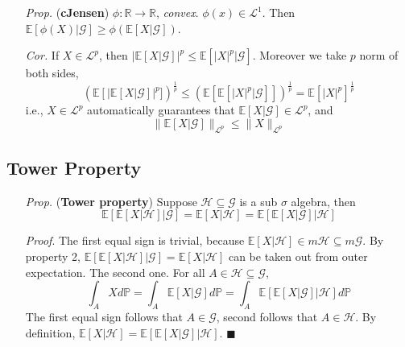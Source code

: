 \documentclass[a4paper,12pt,twoside]{book}
\begin{document}
\begin{itemize}
	\item[\textit{Prop.}] (\textbf{cJensen}) $\phi: \mathbb{R}\to \mathbb{R}$, \textit{convex}. $\phi(x)\in \mathcal{L}^1$. Then $\mathbb{E}\left[\phi(X)|\mathcal{G}\right]\geq \phi(\mathbb{E}\left[X|\mathcal{G}\right])$.

	\item[\textit{Cor.}] If $X\in \mathcal{L}^p$, then $|\mathbb{E}\left[X|\mathcal{G}\right]|^p\leq \mathbb{E}\left[|X|^p|\mathcal{G}\right]$. Moreover we take $p$ norm of both sides,
	\begin{equation}
		(\mathbb{E}\left[|\mathbb{E}\left[X|\mathcal{G}\right]\right|^p])^{\frac{1}{p}}\leq (\mathbb{E}\left[\mathbb{E}\left[|X|^p|\mathcal{G}\right]\right])^{\frac{1}{p}}= \mathbb{E}\left[|X|^p\right]^{\frac{1}{p}}
	\end{equation}
	i.e., $X\in \mathcal{L}^p$ automatically guarantees that $\mathbb{E}\left[X|\mathcal{G}\right]\in \mathcal{L}^p$, and
	\begin{equation}
		\|\mathbb{E}\left[X|\mathcal{G}\right]\|_{\mathcal{L}^p}\leq \|X\|_{\mathcal{L}^p}
	\end{equation}

\end{itemize}

\subsection{Tower Property}
\begin{itemize}
	\item[\textit{Prop.}] (\textbf{Tower property}) Suppose $\mathcal{H} \subseteq \mathcal{G}$ is a sub $\sigma$ algebra, then
	\begin{equation}
		\mathbb{E}\left[\mathbb{E}\left[X|\mathcal{H}\right]|\mathcal{G}\right]= \mathbb{E}\left[X|\mathcal{H}\right] = \mathbb{E}\left[\mathbb{E}\left[X|\mathcal{G}\right] |\mathcal{H}\right]
	\end{equation}
	\item[\textit{Proof}.] The first equal sign is trivial, because $\mathbb{E}\left[X|\mathcal{H}\right] \in m \mathcal{H}\subseteq m\mathcal{G}$. By property 2, $\mathbb{E}\left[\mathbb{E}\left[X|\mathcal{H}\right] |\mathcal{G}\right]= \mathbb{E}\left[X|\mathcal{H}\right]$ can be taken out from outer expectation. \newline
	The second one. For all $A\in \mathcal{H} \subseteq \mathcal{G}$,
	\begin{equation}
		\int_A X d\mathbb{P}= \int_A \mathbb{E}\left[X|\mathcal{G}\right] d\mathbb{P}=\int_A \mathbb{E}\left[\mathbb{E}\left[X|\mathcal{G}\right] |\mathcal{H}\right] d\mathbb{P}
	\end{equation}
	The first equal sign follows that $A\in \mathcal{G}$, second follows that $A\in \mathcal{H}$. By definition, $\mathbb{E}\left[X|\mathcal{H}\right]=\mathbb{E}\left[\mathbb{E}\left[X|\mathcal{G}\right] |\mathcal{H}\right]$. $\blacksquare$
\end{itemize}
\end{document}
